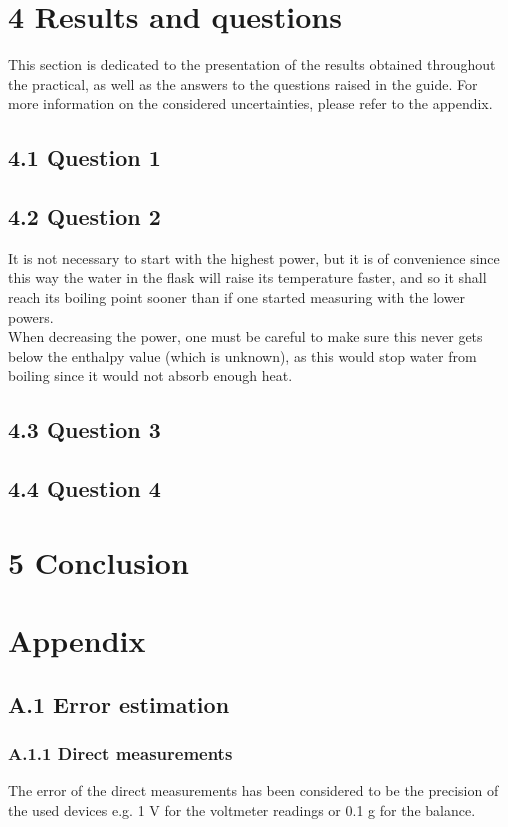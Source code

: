 \documentclass[a4paper, 12pt]{article}
\begin{document}
\section{4 Results and questions}
This section is dedicated to the presentation of the results obtained throughout the practical, as well as the answers to the questions raised in the guide. For more information on the considered uncertainties, please refer to the appendix.
\subsection{4.1 Question 1}
\subsection{4.2 Question 2}
It is not necessary to start with the highest power, but it is of convenience since this way the water in the flask will raise its temperature faster, and so it shall reach its boiling point sooner than if one started measuring with the lower powers. \\

When decreasing the power, one must be careful to make sure this never gets below the enthalpy value (which is unknown), as this would stop water from boiling since it would not absorb enough heat.

\subsection{4.3 Question 3}

\subsection{4.4 Question 4}

\section{5 Conclusion}

\newpage
\section{Appendix}
\subsection{A.1 Error estimation}
\subsubsection{A.1.1 Direct measurements}
The error of the direct measurements has been considered to be the precision of the used devices e.g. 1 V for the voltmeter readings or 0.1 g for the balance. 
\end{document}
